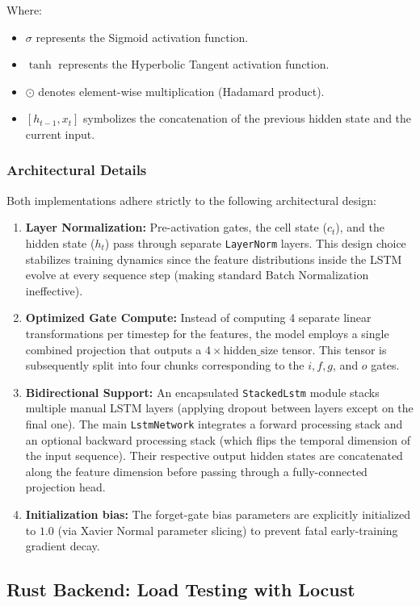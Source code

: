 \documentclass{ieeeaccess}
\begin{document}
Where:
\begin{itemize}
    \item $\sigma$ represents the Sigmoid activation function.
    \item $\tanh$ represents the Hyperbolic Tangent activation function.
    \item $\odot$ denotes element-wise multiplication (Hadamard product).
    \item $[h_{t-1}, x_t]$ symbolizes the concatenation of the previous hidden state and the current input.
\end{itemize}

\subsubsection{Architectural Details}
Both implementations adhere strictly to the following architectural design:
\begin{enumerate}
    \item \textbf{Layer Normalization:} Pre-activation gates, the cell state ($c_t$), and the hidden state ($h_t$) pass through separate \texttt{LayerNorm} layers. This design choice stabilizes training dynamics since the feature distributions inside the LSTM evolve at every sequence step (making standard Batch Normalization ineffective).
    \item \textbf{Optimized Gate Compute:} Instead of computing 4 separate linear transformations per timestep for the features, the model employs a single combined projection that outputs a $4 \times \text{hidden\_size}$ tensor. This tensor is subsequently split into four chunks corresponding to the $i, f, g$, and $o$ gates.
    \item \textbf{Bidirectional Support:} An encapsulated \texttt{StackedLstm} module stacks multiple manual LSTM layers (applying dropout between layers except on the final one). The main \texttt{LstmNetwork} integrates a forward processing stack and an optional backward processing stack (which flips the temporal dimension of the input sequence). Their respective output hidden states are concatenated along the feature dimension before passing through a fully-connected projection head.
    \item \textbf{Initialization bias:} The forget-gate bias parameters are explicitly initialized to $1.0$ (via Xavier Normal parameter slicing) to prevent fatal early-training gradient decay.
\end{enumerate}


\subsection{Rust Backend: Load Testing with Locust}
\end{document}
